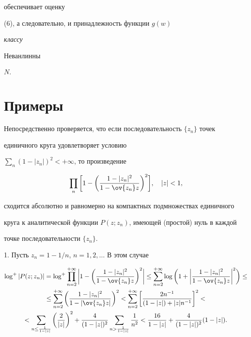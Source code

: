 обеспечивает оценку 


(6), а следовательно, и принадлежность функции $g(w)$ {\it классу 


Неванлинны} $N$. 


 


\section{Примеры} 


 


Непосредственно проверяется, что если последовательность $\{z_n\}$ точек 


единичного круга удовлетворяет условию 


$\sum\limits_n(1-|z_n|)^2<+\infty$, то произведение 


\begin{equation} 


\prod_n\bigg[1-\bigg(\frac{1-|z_n|^2}{1-\ov{z_n}z}\bigg)^2\bigg], 


\quad |z|<1, 


\end{equation} 


сходится абсолютно и равномерно на компактных подмножествах единичного 


круга к аналитической функции $P(z;z_n)$, имеющей (простой) нуль в каждой 


точке последовательности $\{z_n\}$. 


\medskip 


 


1. Пусть $z_n=1-1/n$, $n=1,2,\dotsc$ В этом случае 


\begin{multline*} 


\log^+|P(z;z_n)|=\log^+\prod^{+\infty}_{n=2}\bigg| 


1-\bigg(\frac{1-|z_n|^2}{1-\ov{z_n}z}\bigg)^2\bigg|\le 


\sum^{+\infty}_{n=2}\log\bigg(1+\bigg| 


\frac{1-|z_n|^2}{1-\ov{z_n}z}\bigg|^2\bigg)\le \\ 


% 


\le\sum^{+\infty}_{n=2}\bigg( 


\frac{1-|z_n|^2}{1-|\ov{z_n}z|}\bigg)^2< 


\sum^{+\infty}_{n=2}\bigg[ 


\frac{2n^{-1}}{(1-|z|)+|z|n^{-1}}\bigg]^{2}< \\ 


% 


<\sum_{n\le\frac{1}{1-|z|}}\bigg(\frac{2}{|z|} \bigg)^2+ 


\frac{4}{(1-|z|)^2}\sum_{n>\frac{1}{1-|z|}} 


\frac{1}{n^2}<\frac{16}{1-|z|}+\frac{4}{(1-|z|)^2}(1-|z|). 


\end{multline*} 


